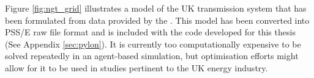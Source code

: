 Figure \ref{fig:ngt_grid} illustrates a model of the UK transmission system that
has been formulated from data provided by the .  This model
has been converted into PSS/E raw file format and is included with the code
developed for this thesis (See Appendix \ref{sec:pylon}).
It is currently too computationally expensive to be solved repeatedly in an
agent-based simulation, but optimisation efforts might allow for it to be used
in studies pertinent to the UK energy industry.

